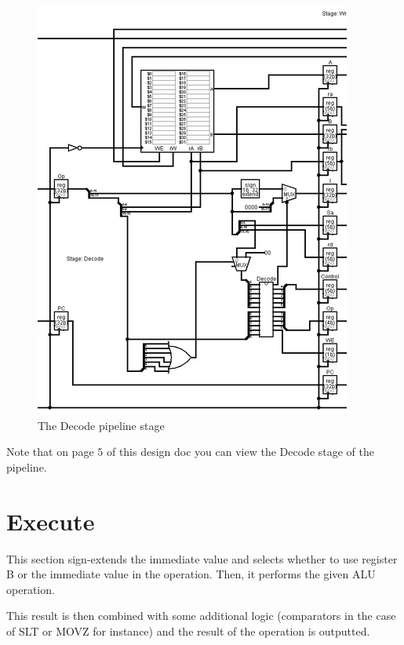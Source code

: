 \documentclass{article}
\begin{document}
\begin{figure}[h]
	\includegraphics[width = \textwidth]{decode}
	\caption{The Decode pipeline stage}
\end{figure}

Note that on page $5$ of this design doc you can view the Decode stage of the pipeline.

\section*{Execute}
This section sign-extends the immediate value and selects whether to use register B or the immediate value in the operation.  Then, it performs the given ALU operation.

This result is then combined with some additional logic (comparators in the case of SLT  or MOVZ for instance) and the result of the operation is outputted.
\end{document}
